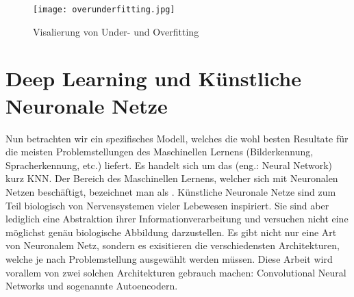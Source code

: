 \begin{figure}[h!]
  \centering
  \texttt{[image: overunderfitting.jpg]}
  \caption{Visalierung von Under- und Overfitting}
\end{figure}

\cite{wiki:overfitting}


\chapter{Deep Learning und Künstliche Neuronale Netze}
Nun betrachten wir ein spezifisches Modell, welches die wohl besten Resultate
für die meisten Problemstellungen des Maschinellen Lernens (Bilderkennung,
Spracherkennung, etc.) liefert. Es handelt sich um das  (eng.: Neural Network) kurz KNN.
Der Bereich des Maschinellen Lernens, welcher sich mit Neuronalen Netzen
beschäftigt, bezeichnet man als .
\para{}
Künstliche Neuronale Netze sind zum Teil biologisch von Nervensystemen vieler
Lebewesen inspiriert.
Sie sind aber lediglich eine Abstraktion ihrer Informationverarbeitung und versuchen nicht eine möglichst genäu biologische Abbildung darzustellen.
Es gibt nicht nur eine Art von Neuronalem Netz, sondern es exisitieren die
verschiedensten Architekturen, welche je nach Problemstellung ausgewählt werden
müssen. Diese Arbeit wird vorallem von zwei solchen Architekturen gebrauch machen:
Convolutional Neural Networks und sogenannte Autoencodern.

\para{}
\cite{wiki:kuenstliches_neuronales_netz}

